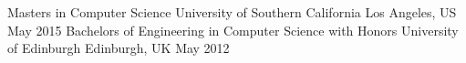 \begin{cventries}
  \cventry
    {Masters in Computer Science}
    {University of Southern California}
    {Los Angeles, US}
    {May 2015}
    {
    }
    {}
    {}
  \cventry
    {Bachelors of Engineering in Computer Science with Honors}
    {University of Edinburgh}
    {Edinburgh, UK}
    {May 2012}
    {
    }
    {}
    {}

\end{cventries}
